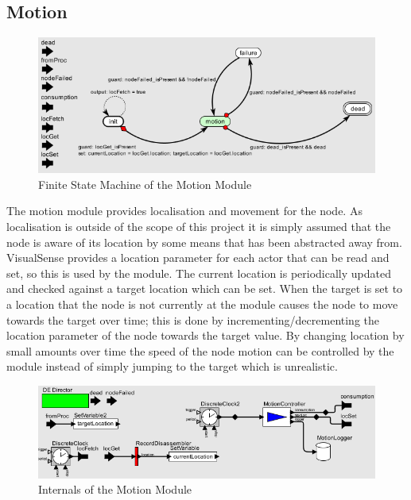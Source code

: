 \documentclass[authoryearcitations]{UoYCSproject}
\begin{document}
\subsection{Motion}

\begin{figure}
 \centering
    \includegraphics[width=\textwidth]{figures/motion_Controller.png}
    \caption{Finite State Machine of the Motion Module}
    \label{fig:motionControl}
\end{figure}

The motion module provides localisation and movement for the node. As localisation is outside of the scope of this project it is simply assumed that the node is aware of its location by some means that has been abstracted away from. VisualSense provides a location parameter for each actor that can be read and set, so this is used by the module. The current location is periodically updated and checked against a target location which can be set. When the target is set to a location that the node is not currently at the module causes the node to move towards the target over time; this is done by incrementing/decrementing the location parameter of the node towards the target value. By changing location by small amounts over time the speed of the node motion can be controlled by the module instead of simply jumping to the target which is unrealistic.

\begin{figure}
 \centering
    \includegraphics[width=\textwidth]{figures/motionInternals.png}
    \caption{Internals of the Motion Module}
    \label{fig:motionInternals}
\end{figure}
\end{document}
